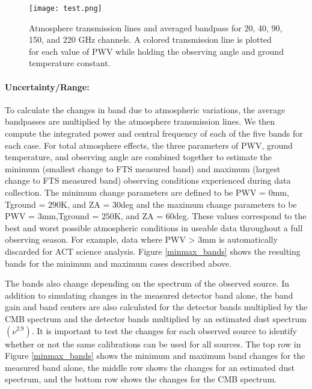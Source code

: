 \begin{figure}[h] %
   \centering
   \centerline{\texttt{[image: test.png]}} 
   \caption{Atmosphere transmission lines and averaged bandpass for 20, 40, 90, 150, and 220 GHz channels.  A colored transmission line is plotted for each value of PWV while holding the observing angle and ground temperature constant.}
   \label{transmissions}
\end{figure}

\paragraph{Uncertainty/Range:}
To calculate the changes in band due to atmospheric variations, the average bandpasses are multiplied by the atmosphere transmission lines.  We then compute the integrated power and central frequency of each of the five bands for each case.  For total atmosphere effects, the three parameters of PWV, ground temperature, and observing angle are combined together to estimate the minimum (smallest change to FTS measured band) and maximum (largest change to FTS measured band) observing conditions experienced during data collection.  The minimum change parameters are defined to be PWV = $0$mm, Tground = $290$K, and ZA = $30$deg and the maximum change parameters to be PWV = $3$mm,Tground = $250$K, and ZA = $60$deg.  These values correspond to the best and worst possible atmospheric conditions in useable data throughout a full observing season.  For example, data where PWV > 3mm is automatically discarded for ACT science analysis.  Figure \ref{minmax_bands} shows the resulting bands for the minimum and maximum cases described above.  

The bands also change depending on the spectrum of the observed source.  In addition to simulating changes in the measured detector band alone, the band gain and band centers are also calculated for the detector bands multiplied by the CMB spectrum and the detector bands multiplied by an estimated dust spectrum $(\nu^{2.9})$.  It is important to test the changes for each observed source to identify whether or not the same calibrations can be used for all sources.  The top row in Figure \ref{minmax_bands} shows the minimum and maximum band changes for the measured band alone, the middle row shows the changes for an estimated dust spectrum, and the bottom row shows the changes for the CMB spectrum.


